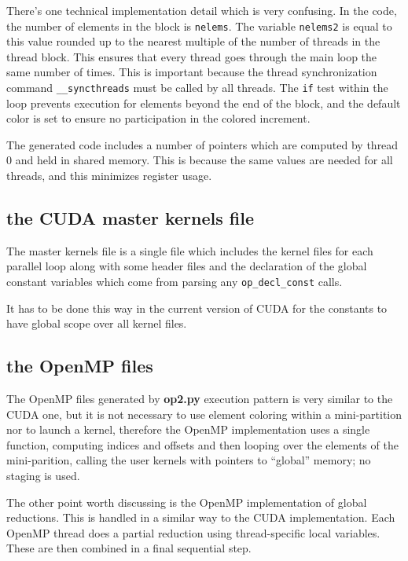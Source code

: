 \documentclass[12pt]{article}
\begin{document}
There's one technical implementation detail which is very confusing.
In the code, the number of elements in the block is {\tt nelems}.
The variable {\tt nelems2} is equal to this value rounded up to the
nearest multiple of the number of threads in the thread block.
This ensures that every thread goes through the main loop the same
number of times.  This is important because the thread synchronization
command {\tt \_\_syncthreads} must be called by all threads.
The {\tt if} test within the loop prevents execution for elements
beyond the end of the block, and the default color is set to ensure
no participation in the colored increment.

The generated code includes a number of pointers which are computed
by thread 0 and held in shared memory.  This is because the same values
are needed for all threads, and this minimizes register usage.

\subsection{the CUDA master kernels file}

The master kernels file is a single file which includes the kernel
files for each parallel loop along with some header files and the
declaration of the global constant variables which come from parsing
any {\tt op\_decl\_const} calls.

It has to be done this way in the current version of CUDA for the
constants to have global scope over all kernel files.


\subsection{the OpenMP files}

The OpenMP files generated by {\bf op2.py} execution pattern is very
similar to the CUDA one, but it is not necessary to use element coloring
within a mini-partition nor to launch a kernel, therefore the OpenMP
implementation uses a single function, computing indices and offsets
and then looping over the elements of the mini-parition, calling the user
kernels with pointers to ``global'' memory; no staging is used.

The other point worth discussing is the OpenMP implementation of
global reductions.  This is handled in a similar way to the CUDA
implementation.  Each OpenMP thread does a partial reduction using
thread-specific local variables.  These are then combined in a final
sequential step.
\end{document}
